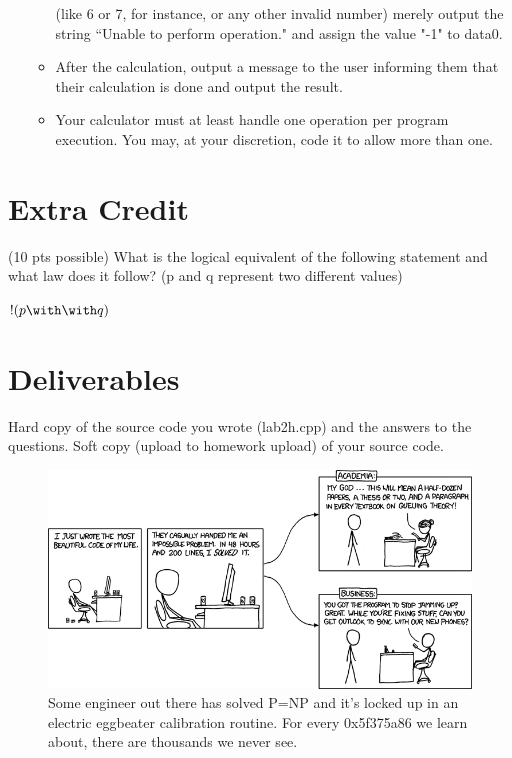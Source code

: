 \documentclass[letterpaper,12pt]{article}
\begin{document}
\begin{enumerate}
\begin{itemize}
                  (like 6 or 7, for instance, or any other invalid number)
                  merely output the string “Unable to perform operation."
                  and assign the value "-1" to data0.
            \item After the calculation, output a message to the user informing them that their
                  calculation is done and output the result.
            \item Your calculator must at least handle one operation per program execution.
                  You may, at your discretion, code it to allow more than one.
        \end{itemize}

\end{enumerate}
\section*{Extra Credit}
(10 pts possible) What is the logical equivalent of the following statement and what law does it follow?
    (p and q represent two different values)

    $!( p \with \with q )$
\section*{Deliverables}
Hard copy of the source code you wrote (lab2h.cpp) and the answers to the questions.
Soft copy (upload to homework upload) of your source code.

\begin{figure}[ht!]
	\centering
	\includegraphics[width=5in]{academia_vs_business.png}
    \caption*{Some engineer out there has solved P=NP and it's locked up in an electric eggbeater calibration routine.  For every 0x5f375a86 we learn about, there are thousands we never see.}
\end{figure}
\end{document}
